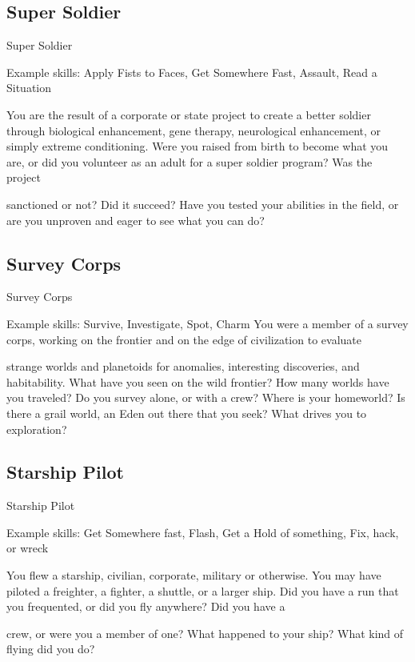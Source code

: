 \subsection{Super Soldier}
                                                 Super Soldier

Example skills: Apply Fists to Faces, Get Somewhere Fast, Assault, Read a Situation

You are the result of a corporate or state project to create a better soldier through biological enhancement,
gene therapy, neurological enhancement, or simply extreme conditioning. Were you raised from birth to
become what you are, or did you volunteer as an adult for a super soldier program? Was the project

sanctioned or not? Did it succeed? Have you tested your abilities in the field, or are you unproven and
eager to see what you can do?

\subsection{Survey Corps}
                                                 Survey Corps

Example skills: Survive, Investigate, Spot, Charm
You were a member of a survey corps, working on the frontier and on the edge of civilization to evaluate

strange worlds and planetoids for anomalies, interesting discoveries, and habitability. What have you seen
on the wild frontier? How many worlds have you traveled? Do you survey alone, or with a crew? Where is
your homeworld? Is there a grail world, an Eden out there that you seek? What drives you to exploration?

\subsection{Starship Pilot}
                                                 Starship Pilot

Example skills: Get Somewhere fast, Flash, Get a Hold of something, Fix, hack, or wreck

You flew a starship, civilian, corporate, military or otherwise. You may have piloted a freighter, a fighter, a
shuttle, or a larger ship. Did you have a run that you frequented, or did you fly anywhere? Did you have a

crew, or were you a member of one? What happened to your ship? What kind of flying did you do?

